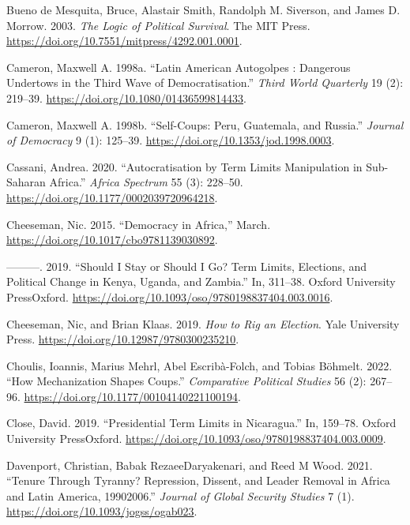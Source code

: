 \documentclass[
  12pt,
]{report}
\newlength{\cslhangindent}
\newenvironment{CSLReferences}[2] %
 {\begin{list}{}{%
  \setlength{\itemindent}{0pt}
  \setlength{\leftmargin}{0pt}
  \setlength{\parsep}{0pt}
  \ifodd #1
   \setlength{\leftmargin}{\cslhangindent}
   \setlength{\itemindent}{-1\cslhangindent}
  \fi
  \setlength{\itemsep}{#2\baselineskip}}}
 {\end{list}}
\begin{document}
\begin{CSLReferences}{1}{0}
Bueno de Mesquita, Bruce, Alastair Smith, Randolph M. Siverson, and
James D. Morrow. 2003. \emph{The Logic of Political Survival}. The MIT
Press. \url{https://doi.org/10.7551/mitpress/4292.001.0001}.

Cameron, Maxwell A. 1998a. {``Latin American Autogolpes : Dangerous
Undertows in the Third Wave of Democratisation.''} \emph{Third World
Quarterly} 19 (2): 219--39.
\url{https://doi.org/10.1080/01436599814433}.

Cameron, Maxwell A. 1998b. {``Self-Coups: Peru, Guatemala, and
Russia.''} \emph{Journal of Democracy} 9 (1): 125--39.
\url{https://doi.org/10.1353/jod.1998.0003}.

Cassani, Andrea. 2020. {``Autocratisation by Term Limits Manipulation in
Sub-Saharan Africa.''} \emph{Africa Spectrum} 55 (3): 228--50.
\url{https://doi.org/10.1177/0002039720964218}.

Cheeseman, Nic. 2015. {``Democracy in Africa,''} March.
\url{https://doi.org/10.1017/cbo9781139030892}.

---------. 2019. {``Should I Stay or Should I Go? Term Limits,
Elections, and Political Change in Kenya, Uganda, and Zambia.''} In,
311--38. Oxford University PressOxford.
\url{https://doi.org/10.1093/oso/9780198837404.003.0016}.

Cheeseman, Nic, and Brian Klaas. 2019. \emph{How to Rig an Election}.
Yale University Press. \url{https://doi.org/10.12987/9780300235210}.

Choulis, Ioannis, Marius Mehrl, Abel Escribà-Folch, and Tobias Böhmelt.
2022. {``How Mechanization Shapes Coups.''} \emph{Comparative Political
Studies} 56 (2): 267--96.
\url{https://doi.org/10.1177/00104140221100194}.

Close, David. 2019. {``Presidential Term Limits in Nicaragua.''} In,
159--78. Oxford University PressOxford.
\url{https://doi.org/10.1093/oso/9780198837404.003.0009}.

Davenport, Christian, Babak RezaeeDaryakenari, and Reed M Wood. 2021.
{``Tenure Through Tyranny? Repression, Dissent, and Leader Removal in
Africa and Latin America, 1990{\textendash}2006.''} \emph{Journal of
Global Security Studies} 7 (1).
\url{https://doi.org/10.1093/jogss/ogab023}.


\end{CSLReferences}
\end{document}
